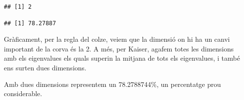\documentclass[
]{article}
\newenvironment{Shaded}{\begin{snugshade}}{\end{snugshade}}
\newcommand{\AttributeTok}[1]{\textcolor[rgb]{0.77,0.63,0.00}{#1}}
\newcommand{\CommentTok}[1]{\textcolor[rgb]{0.56,0.35,0.01}{\textit{#1}}}
\newcommand{\DecValTok}[1]{\textcolor[rgb]{0.00,0.00,0.81}{#1}}
\newcommand{\FloatTok}[1]{\textcolor[rgb]{0.00,0.00,0.81}{#1}}
\newcommand{\FunctionTok}[1]{\textcolor[rgb]{0.00,0.00,0.00}{#1}}
\newcommand{\NormalTok}[1]{#1}
\newcommand{\OtherTok}[1]{\textcolor[rgb]{0.56,0.35,0.01}{#1}}
\newcommand{\SpecialCharTok}[1]{\textcolor[rgb]{0.00,0.00,0.00}{#1}}
\newcommand{\StringTok}[1]{\textcolor[rgb]{0.31,0.60,0.02}{#1}}
\begin{document}
\begin{Shaded}
\end{Shaded}

\begin{verbatim}
## [1] 2
\end{verbatim}

\begin{Shaded}
\end{Shaded}

\begin{verbatim}
## [1] 78.27887
\end{verbatim}

Gràficament, per la regla del colze, veiem que la dimensió on hi ha un
canvi important de la corva és la 2. A més, per Kaiser, agafem totes les
dimensions amb els eigenvalues els quals superin la mitjana de tots els
eigenvalues, i també ens surten dues dimensions.

Amb dues dimensions representem un 78.2788744\%, un percentatge prou
considerable.

\begin{Shaded}
\end{Shaded}
\end{document}
